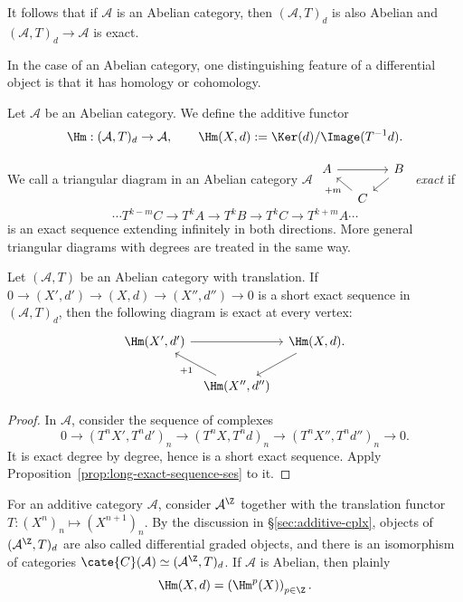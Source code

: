 It follows that if $\mathcal{A}$ is an Abelian category, then
$(\mathcal{A},T)_d$ is also Abelian and
$(\mathcal{A},T)_d\to\mathcal{A}$ is exact.

In the case of an Abelian category, one distinguishing feature of a
differential object is that it has homology or cohomology.

\begin{definition}
	Let $\mathcal{A}$ be an Abelian category. We define the additive functor
	\[ \Hm:(\mathcal{A},T)_d\to\mathcal{A},\qquad
	   \Hm(X,d):=\Ker(d)/\Image(T^{-1}d). \]
\end{definition}

We call a triangular diagram in an Abelian category $\mathcal{A}$
$\begin{tikzcd}[column sep=small, row sep=small]
	A \arrow[rr] & & B \arrow[ld] \\
	& C \arrow[lu, "+m"] &
\end{tikzcd}$
\emph{exact} if
\[ \cdots T^{k-m}C\to T^kA\to T^kB\to T^kC\to T^{k+m}A\cdots \]
is an exact sequence extending infinitely in both directions. More general
triangular diagrams with degrees are treated in the same way.

\begin{lemma}\label{prop:diff-obj-triangle}
	Let $(\mathcal{A},T)$ be an Abelian category with translation. If
	$0\to(X',d')\to(X,d)\to(X'',d'')\to0$ is a short exact sequence in
	$(\mathcal{A},T)_d$, then the following diagram is exact at every vertex:
	\[\begin{tikzcd}[column sep=tiny]
		\Hm(X',d') \arrow[rr] & & \Hm(X,d) \arrow[ld] . \\
		& \Hm(X'',d'') \arrow[lu, "{+1}"] &
	\end{tikzcd}\]
\end{lemma}
\begin{proof}
	In $\mathcal{A}$, consider the sequence of complexes
	\[ 0\to(T^nX',T^nd')_n\to(T^nX,T^nd)_n
	   \to(T^nX'',T^nd'')_n\to0. \]
	It is exact degree by degree, hence is a short exact sequence. Apply
	Proposition~\ref{prop:long-exact-sequence-ses} to it.
\end{proof}

\begin{example}\label{eg:cplx-as-diff}
	For an additive category $\mathcal{A}$, consider $\mathcal{A}^{\Z}$ together
	with the translation functor $T:(X^n)_n\mapsto(X^{n+1})_n$. By the
	discussion in \S\ref{sec:additive-cplx}, objects of
	$(\mathcal{A}^{\Z},T)_d$ are also called differential graded objects, and
	there is an isomorphism of categories
	$\cate{C}(\mathcal{A})\simeq(\mathcal{A}^{\Z},T)_d$. If $\mathcal{A}$ is
	Abelian, then plainly
	\[ \Hm(X,d)=\left(\Hm^p(X)\right)_{p\in\Z}. \]
\end{example}

